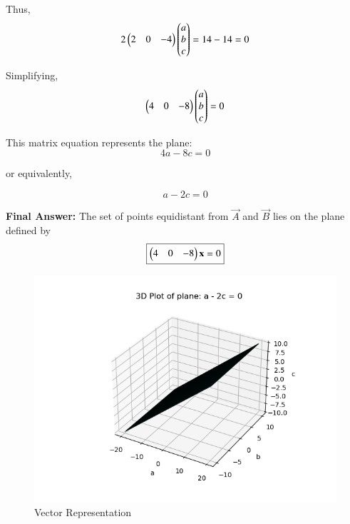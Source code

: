 \documentclass[journal]{IEEEtran}
\begin{document}
Thus,
\[
2 \begin{pmatrix}2 & 0 & -4\end{pmatrix} \begin{pmatrix}a \\ b \\ c\end{pmatrix} = 14 - 14 = 0
\]

Simplifying,
\[
\begin{pmatrix}4 & 0 & -8\end{pmatrix} \begin{pmatrix}a \\ b \\ c\end{pmatrix} = 0
\]

This matrix equation represents the plane:
\[
4a - 8c = 0
\]

or equivalently,

\[
a - 2c = 0
\]

\textbf{Final Answer:} The set of points equidistant from \(\vec{A}\) and \(\vec{B}\) lies on the plane defined by
\[
\boxed{
\begin{pmatrix}4 & 0 & -8\end{pmatrix} \mathbf{x} = 0
}
\]


\begin{figure}[htbp]
    \centering
    \includegraphics[width=0.65\linewidth]{FIG/fig1.png}
    \caption{Vector Representation}
    \label{fig:FIG/fig1.png}
    \end{figure}
\end{document}
